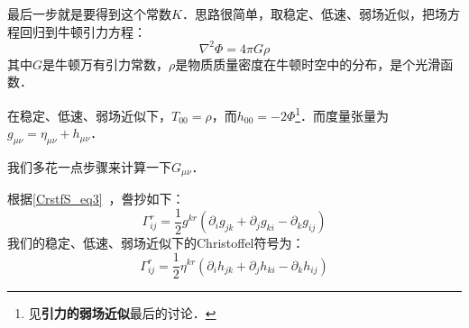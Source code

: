 最后一步就是要得到这个常数$K$．思路很简单，取稳定、低速、弱场近似，把场方程回归到牛顿引力方程：
\begin{equation}
\nabla^2\Phi=4\pi G\rho
\end{equation}
其中$G$是牛顿万有引力常数，$\rho$是物质质量密度在牛顿时空中的分布，是个光滑函数．


在稳定、低速、弱场近似下，$T_{00}=\rho$，而$h_{00}=-2\Phi$\footnote{见\textbf{引力的弱场近似}最后的讨论．}．而度量张量为$g_{\mu\nu}=\eta_{\mu\nu}+h_{\mu\nu}$．

我们多花一点步骤来计算一下$G_{\mu\nu}$．

根据\autoref{CrstfS_eq3}~，誊抄如下：
\begin{equation}
\Gamma^{r}_{ij}=\frac{1}{2}g^{kr}(\partial_ig_{jk}+\partial_jg_{ki}-\partial_kg_{ij})
\end{equation}
我们的稳定、低速、弱场近似下的Christoffel符号为：
\begin{equation}
\Gamma^{r}_{ij}=\frac{1}{2}\eta^{kr}(\partial_ih_{jk}+\partial_jh_{ki}-\partial_kh_{ij})
\end{equation}












